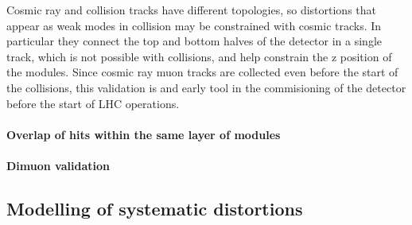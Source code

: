 Cosmic ray and collision tracks have different topologies, so distortions that appear as
weak modes in collision may be constrained with cosmic tracks.
In particular they connect the top and bottom halves of the detector in a single track,
which is not possible with collisions, and help constrain the z position of the modules.
Since cosmic ray muon tracks are collected even before the start of the collisions,
this validation is and early tool in the commisioning of the detector before the start of LHC operations.

\paragraph{Overlap of hits within the same layer of modules\\}

\paragraph{Dimuon validation\\}

\subsection{Modelling of systematic distortions}

\cite{CMS-TRK-20-001}
